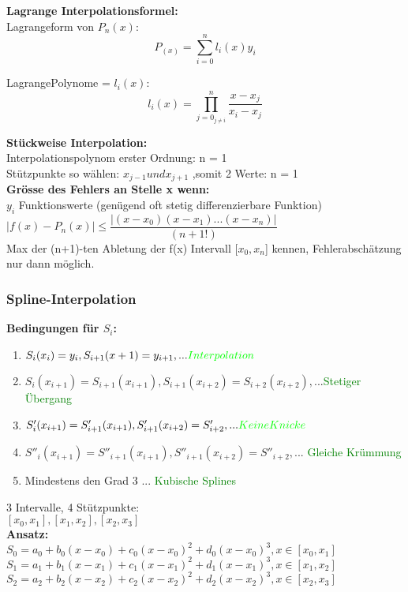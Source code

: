 \documentclass[../ZF_HM2.tex]{subfiles}
\begin{document}
\begin{mdframed}
	\textbf{Lagrange Interpolationsformel:\\}
	Lagrangeform von $P_n(x):$\\
	 \[ P_(x) =\sum_{i=0}^{n} l_i(x)y_i \]
	
	LagrangePolynome = $l_i(x)$:
	\[ l_i(x) =\prod_{j=0_{j\neq i}}^{n} \dfrac {x-x_j}{x_i-x_j} \]
	
\end{mdframed}

\textbf{Stückweise Interpolation:\\}
Interpolationspolynom erster Ordnung: n = 1\\
Stützpunkte so wählen: $x_{j-1} und x_{j+1}$ ,somit 2 Werte: n = 1\\

\textbf{Grösse des Fehlers an Stelle x wenn:\\}
$y_i$ Funktionswerte (genügend oft stetig differenzierbare Funktion)\\
$|f(x)-P_n(x)|\leq \dfrac{|(x-x_0)(x-x_1)...(x-x_n)|}{(n+1!)}$\\
Max der (n+1)-ten Abletung der f(x) Intervall [$x_0,x_n$] kennen, Fehlerabschätzung nur dann möglich.


\subsubsection{Spline-Interpolation}

\textbf{Bedingungen für $S_i$:\\}

\begin{enumerate}
	\item $S_i(x_i) = y_i, S_{i+1}(x+1) = y_{i+1}, ... \textcolor{green} {Interpolation}$
	\item $S_i(x_{i+1}) = S_{i+1}(x_{i+1}),S_{i+1}(x_{i+2}) = S_{i+2}(x_{i+2}),...$\textcolor {green} {Stetiger Übergang}
	\item $S'_i(x_{i+1}) = S'_{i+1}(x_{i+1}),S'_{i+1}(x_{i+2}) = S'_{i+2}, ... \textcolor{green}{Keine Knicke}$
		\item $S''_i(x_{i+1}) = S''_{i+1}(x_{i+1}),S''_{i+1}(x_{i+2}) = S''_{i+2}, ...$ \textcolor{green}{Gleiche Krümmung}
		\item Mindestens den Grad 3 ... \textcolor{green}{Kubische Splines}
\end{enumerate}



3 Intervalle, 4 Stützpunkte:\\
$[x_0,x_1],[x_1,x_2],[x_2,x_3]$\\
\textbf{Ansatz:\\}
$S_0 = a_0 + b_0(x-x_0) + c_0(x-x_0)^{2} + d_0(x-x_0)^{3},x\in[x_0,x_1]$\\
$S_1 = a_1 + b_1(x-x_1) + c_1(x-x_1)^{2} + d_1(x-x_1)^{3},x\in[x_1,x_2]$\\
$S_2 = a_2 + b_2(x-x_2) + c_2(x-x_2)^{2} + d_2(x-x_2)^{3},x\in[x_2,x_3]$\\
\end{document}
